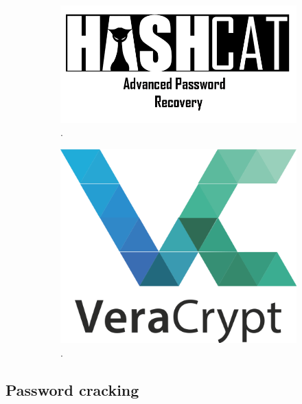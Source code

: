 \documentclass[12pt]{article}
\begin{document}
\begin{figure}[!ht]
     \centering
     \begin{subfigure}[b]{0.5\textwidth}
         \centering
         \includegraphics[width=\textwidth]{images/hashcat.png}.
         \label{fig:hashcat}
     \end{subfigure}
     \hspace{30 pt}
     \begin{subfigure}[b]{0.3\textwidth}
         \centering
         \includegraphics[width=\textwidth]{images/veracrypt.png}.
    \label{fig:veracrypt}
     \end{subfigure}
\end{figure}

\subsection{Password cracking}
\end{document}

